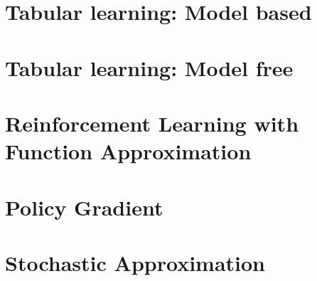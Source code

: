 \documentclass[12pt]{book}
\begin{document}
\chapter{Tabular learning: Model based}



\chapter{Tabular learning: Model free}
\label{chapter:learning-model-free}

\newpage


\chapter{Reinforcement Learning with Function Approximation}


\chapter{Policy Gradient}


\chapter{Stochastic Approximation}



%

%
%
\end{document}
